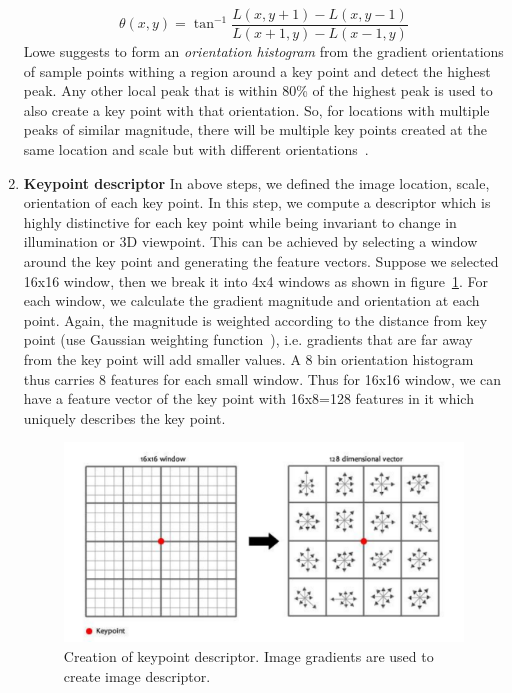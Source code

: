 \begin{enumerate}
\begin{equation}
\theta(x,y)=\tan^{-1}\frac{L(x,y+1)-L(x,y-1)}{L(x+1,y)-L(x-1,y)}
\label{eq:orient-theta}
\end{equation}
Lowe suggests to form an \emph{orientation histogram} from the gradient orientations of sample points withing a region around a key point and detect the highest peak. Any other local peak that is within 80\% of the highest peak is used to also create a key point with that orientation. So, for locations with multiple peaks of similar magnitude, there will be multiple key points created at the same location and scale but with different orientations~\cite{Lowe:04}.

\item \textbf{Keypoint descriptor}
In above steps, we defined the image location, scale, orientation of each key point. In this step, we compute a descriptor which is highly distinctive for each key point while being invariant to change in illumination or 3D viewpoint. This can be achieved by selecting a window around the key point and generating the feature vectors. Suppose we selected 16x16 window, then we break it into 4x4 windows as shown in figure~\ref{fig:keypoint-descriptor}. For each window, we calculate the gradient magnitude and orientation at each point. Again, the magnitude is weighted according to the distance from key point (use Gaussian weighting function~\cite{Lowe:04}), i.e. gradients that are far away from the key point will add smaller values. A 8 bin orientation histogram thus carries 8 features for each small window. Thus for 16x16 window, we can have a feature vector of the key point with 16x8=128 features in it which uniquely describes the key point.

\begin{figure}%
\centering
\includegraphics[width=0.9\columnwidth]{2.mainmatter/2.Methodology/FeaturesExtraction/figures/SIFT/keypoint-descriptor}%
\caption[Creation of Key-point Descriptor]{Creation of keypoint descriptor. Image gradients are used to create image descriptor. }%
\label{fig:keypoint-descriptor}%
\end{figure}
\end{enumerate}

